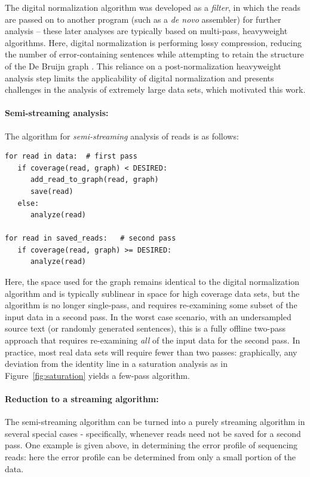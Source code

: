 \documentclass{article}
\begin{document}
The digital normalization algorithm was developed as a {\em filter},
in which the reads are passed on to another program (such as a {\em
  de novo} assembler) for further analysis -- these later analyses are
typically based on multi-pass, heavyweight algorithms.  Here, digital
normalization is performing lossy compression, reducing the number of
error-containing sentences while attempting to retain the structure of
the De Bruijn graph \cite{Brown2012, Zhang2014, Lowe}.  This reliance
on a post-normalization heavyweight analysis step limits the
applicability of digital normalization and presents challenges in the
analysis of extremely large data sets, which motivated this work.

\paragraph{Semi-streaming analysis:} The algorithm for {\em semi-streaming} analysis of reads is as
follows:
\begin{verbatim}
for read in data:  # first pass
   if coverage(read, graph) < DESIRED:
      add_read_to_graph(read, graph)
      save(read)
   else:
      analyze(read)

for read in saved_reads:   # second pass
   if coverage(read, graph) >= DESIRED:
      analyze(read)
\end{verbatim}
Here, the space used for the graph remains identical to the digital
normalization algorithm and is typically sublinear in space for high
coverage data sets, but the algorithm is no longer single-pass, and
requires re-examining some subset of the input data in a second pass.
In the worst case scenario, with an undersampled source text (or
randomly generated sentences), this is a fully offline two-pass
approach that requires re-examining {\em all} of the input data for
the second pass.  In practice, most real data sets will require fewer
than two passes: graphically, any deviation from the identity line in
a saturation analysis as in Figure~\ref{fig:saturation} yields a
few-pass algorithm.

\paragraph{Reduction to a streaming algorithm:} The semi-streaming
algorithm can be turned into a purely streaming algorithm in several
special cases - specifically, whenever reads need not be saved for a
second pass.  One example is given above, in determining the error
profile of sequencing reads: here the error profile can be determined
from only a small portion of the data.
\end{document}
